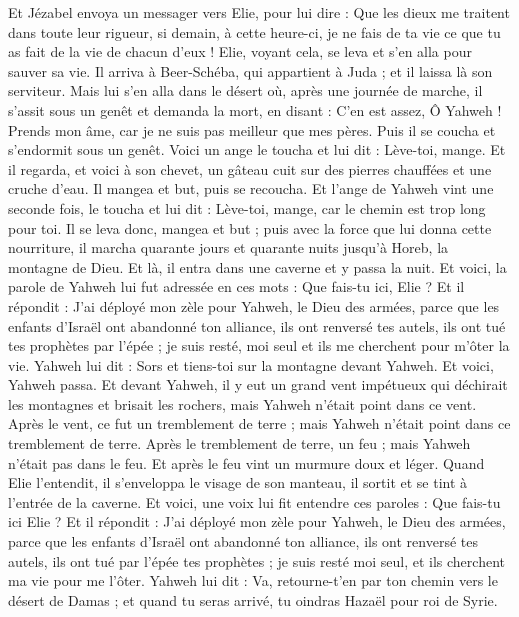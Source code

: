 \begin{multicols}{2}
Et Jézabel envoya un messager vers Elie, pour lui dire : Que les dieux me traitent dans toute leur rigueur, si demain, à cette heure-ci, je ne fais de ta vie ce que tu as fait de la vie de chacun d'eux !
Elie, voyant cela, se leva et s'en alla pour sauver sa vie. Il arriva à Beer-Schéba, qui appartient à Juda ; et il laissa là son serviteur.
Mais lui s'en alla dans le désert où, après une journée de marche, il s'assit sous un genêt et demanda la mort, en disant : C'en est assez, Ô Yahweh ! Prends mon âme, car je ne suis pas meilleur que mes pères.
Puis il se coucha et s'endormit sous un genêt. Voici un ange le toucha et lui dit : Lève-toi, mange.
Et il regarda, et voici à son chevet, un gâteau cuit sur des pierres chauffées et une cruche d'eau. Il mangea et but, puis se recoucha.
Et l'ange de Yahweh vint une seconde fois, le toucha et lui dit : Lève-toi, mange, car le chemin est trop long pour toi.
Il se leva donc, mangea et but ; puis avec la force que lui donna cette nourriture, il marcha quarante jours et quarante nuits jusqu'à Horeb, la montagne de Dieu.
Et là, il entra dans une caverne et y passa la nuit. Et voici, la parole de Yahweh lui fut adressée en ces mots : Que fais-tu ici, Elie ?
Et il répondit : J'ai déployé mon zèle pour Yahweh, le Dieu des armées, parce que les enfants d'Israël ont abandonné ton alliance, ils ont renversé tes autels, ils ont tué tes prophètes par l'épée ; je suis resté, moi seul et ils me cherchent pour m'ôter la vie.
Yahweh lui dit : Sors et tiens-toi sur la montagne devant Yahweh. Et voici, Yahweh passa. Et devant Yahweh, il y eut un grand vent impétueux qui déchirait les montagnes et brisait les rochers, mais Yahweh n'était point dans ce vent. Après le vent, ce fut un tremblement de terre ; mais Yahweh n'était point dans ce tremblement de terre.
Après le tremblement de terre, un feu ; mais Yahweh n'était pas dans le feu. Et après le feu vint un murmure doux et léger.
Quand Elie l'entendit, il s’enveloppa le visage de son manteau, il sortit et se tint à l'entrée de la caverne. Et voici, une voix lui fit entendre ces paroles : Que fais-tu ici Elie ?
Et il répondit : J'ai déployé mon zèle pour Yahweh, le Dieu des armées, parce que les enfants d'Israël ont abandonné ton alliance, ils ont renversé tes autels, ils ont tué par l'épée tes prophètes ; je suis resté moi seul, et ils cherchent ma vie pour me l'ôter.
Yahweh lui dit : Va, retourne-t'en par ton chemin vers le désert de Damas ; et quand tu seras arrivé, tu oindras Hazaël pour roi de Syrie.

\end{multicols}
